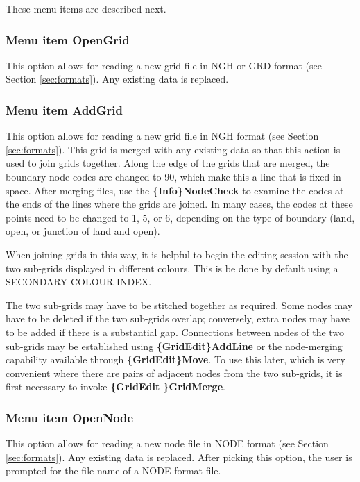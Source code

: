 \documentclass{article}
\begin{document}
These menu items are described next.

\subsubsection[Menu item OpenGrid]{Menu item OpenGrid}
This option allows for reading a new grid file in NGH or GRD format (see Section \ref{sec:formats}). Any existing data is replaced.

\subsubsection[Menu item AddGrid]{Menu item AddGrid}
This option allows for reading a new grid file in NGH format (see Section \ref{sec:formats}). This grid is merged with any existing data so that this action is used to join grids together. Along the edge of the grids that are merged, the boundary node codes are changed to 90, which make this a line that is fixed in space. After merging files, use the \textbf{\{Info\}NodeCheck} to examine the codes at the ends of the lines where the grids are joined. In many cases, the codes at these points need to be changed to 1, 5, or 6, depending on the type of boundary (land, open, or junction of land and open).

When joining grids in this way, it is helpful to begin the editing session with the two sub-grids displayed in different colours. This is be done by default using a SECONDARY COLOUR INDEX.

The two sub-grids may have to be stitched together as required. Some nodes may have to be deleted if the two sub-grids overlap; conversely, extra nodes may have to be added if there is a substantial gap. Connections between nodes of the two sub-grids may be established using \textbf{\{GridEdit\}AddLine} or the node-merging capability available through \textbf{\{GridEdit\}Move}. To use this later, which is very convenient where there are pairs of adjacent nodes from the two sub-grids, it is first necessary to invoke \textbf{\{GridEdit \}GridMerge}.

\subsubsection[Menu item OpenNode]{Menu item OpenNode}
This option allows for reading a new node file in NODE format (see Section \ref{sec:formats}). Any existing data is replaced. After picking this option, the user is prompted for the file name of a NODE format file.
\end{document}
